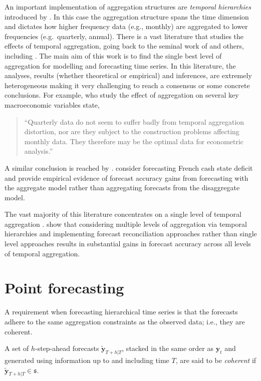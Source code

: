 \documentclass[graybox]{svmult}
\begin{document}
An important implementation of aggregation structures are \textit{temporal hierarchies} introduced by \citet{AthEtAl2017}. In this case the aggregation structure spans the time dimension and dictates how higher frequency data (e.g., monthly) are aggregated to lower frequencies (e.g.\ quarterly, annual). There is a vast literature that studies the effects of temporal aggregation, going back to the seminal work of \citet{ZelMon1971, AmeWu1972, Tia1972, Bre1973} and others, including \citet{Hot1993, HotCar1993, Mar1999, SilEtAl2008}. The main aim of this work is to find the single best level of aggregation for modelling and forecasting time series. In this literature, the analyses, results (whether theoretical or empirical) and inferences, are extremely heterogeneous making it very challenging to reach a consensus or some concrete conclusions. For example, \citet{RosSea1995} who study the effect of aggregation on several key macroeconomic variables state,
\begin{quote}
``Quarterly data do not seem to suffer badly from temporal aggregation distortion, nor are they subject to the construction problems affecting monthly data. They therefore may be the optimal data for econometric analysis.''
\end{quote}
A similar conclusion is reached by \citet{NijPal1990}. \citet{SilEtAl2008} consider forecasting French cash state deficit and provide empirical evidence of forecast accuracy gains from forecasting with the aggregate model rather than aggregating forecasts from the disaggregate model.

The vast majority of this literature concentrates on a single level of temporal aggregation \citep[although there are some notable exceptions such as][]{AndEtAl2011,KouEtAl2014}. \citet{AthEtAl2017} show that considering multiple levels of aggregation via temporal hierarchies and implementing forecast reconciliation approaches rather than single level approaches results in substantial gains in forecast accuracy across all levels of temporal aggregation.

\section{Point forecasting}\label{sec:point forecasting}

A requirement when forecasting hierarchical time series is that the forecasts adhere to the same aggregation constraints as the observed data; i.e., they are coherent.

\begin{definition}\label{def:coherence}
	A set of $h$-step-ahead forecasts $\tilde{\bm{y}}_{T+h|T}$, stacked in the same order as $\bm{y}_{t}$ and generated using information up to and including time $T$, are said to be \textit{coherent} if $\tilde{\bm{y}}_{T+h|T} \in \mathfrak{s}$.
\end{definition}
\end{document}
